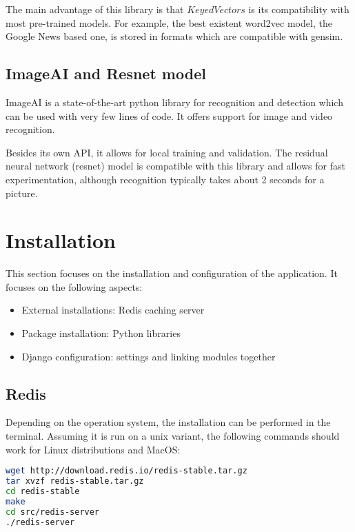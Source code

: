 The main advantage of this library is that $KeyedVectors$ is its compatibility with most pre-trained models. For example, the best existent word2vec model, the Google News based one, is stored in formats which are compatible with gensim.

\subsection{ImageAI and Resnet model}
\label{subsec:app_libraries_imageai}

ImageAI is a state-of-the-art python library for recognition and detection which can be used with very few lines of code. It offers support for image and video recognition. 

Besides its own API, it allows for local training and validation. The residual neural network (resnet) model is compatible with this library and allows for fast experimentation, although recognition typically takes about 2 seconds for a picture.

\section{Installation}
\label{sec:app_install}

This section focuses on the installation and configuration of the application. It focuses on the following aspects:

\begin{itemize}
\item{External installations: Redis caching server}
\item{Package installation: Python libraries}
\item{Django configuration: settings and linking modules together}
\end{itemize}

\subsection{Redis}
\label{subsec:app_install_redis}

Depending on the operation system, the installation can be performed in the terminal. Assuming it is run on a unix variant, the following commands should work for Linux distributions and MacOS:

\begin{lstlisting}[language=Bash]
wget http://download.redis.io/redis-stable.tar.gz
tar xvzf redis-stable.tar.gz
cd redis-stable
make
cd src/redis-server
./redis-server
\end{lstlisting}

